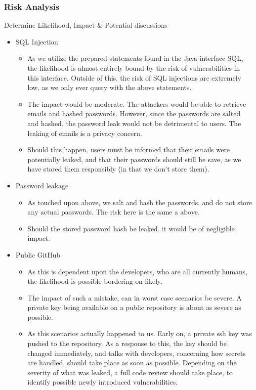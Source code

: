\documentclass{article}
\begin{document}
\subsubsection{\Large Risk Analysis}

{\large Determine Likelihood, Impact & Potential discussions}

\begin{itemize}
    \item SQL Injection
    \begin{itemize}
        \item As we utilize the prepared statements found in the Java interface SQL, the likelihood is almost entirely bound by the risk of vulnerabilities in this interface. Outside of this, the risk of SQL injections are extremely low, as we only ever query with the above statements.
        \item The impact would be moderate. The attackers would be able to retrieve emails and hashed passwords. However, since the passwords are salted and hashed, the password leak would not be detrimental to users. The leaking of emails is a privacy concern.
        \item Should this happen, users must be informed that their emails were potentially leaked, and that their passwords should still be save, as we have stored them responsibly (in that we don't store them).
    \end{itemize}
    \item Password leakage
    \begin{itemize}
        \item As touched upon above, we salt and hash the passwords, and do not store any actual passwords. The risk here is the same a above.
        \item Should the stored password hash be leaked, it would be of negligible impact.
    \end{itemize}
    \item Public GitHub
    \begin{itemize}
        \item As this is dependent upon the developers, who are all currently humans, the likelihood is possible bordering on likely.
        \item The impact of such a mistake, can in worst case scenarios be severe. A private key being available on a public repository is about as severe as possible.
        \item As this scenarios actually happened to us. Early on, a private ssh key was pushed to the repository. As a response to this, the key should be changed immediately, and talks with developers, concerning how secrets are handled, should take place as soon as possible. Depending on the severity of what was leaked, a full code review should take place, to identify possible newly introduced vulnerabilities.

\end{itemize}
\end{itemize}
\end{document}
